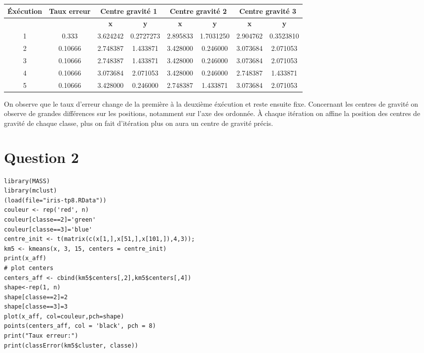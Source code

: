\documentclass[a4paper,12pt]{report}
\begin{document}
\begin{tabular}{|c|c|c|c|c|c|c|c|}
   \hline
   \cellcolor{gray!40}\textbf{Éxécution} & \cellcolor{gray!40}\textbf{Taux erreur} & \multicolumn{2}{c}{\cellcolor{gray!40}\textbf{Centre gravité 1}} & \multicolumn{2}{c}{\cellcolor{gray!40}\textbf{Centre gravité 2}} & \multicolumn{2}{c}{\cellcolor{gray!40}\textbf{Centre gravité 3}} \\
   \hline
   \cellcolor{gray!40}\textbf{ } & \cellcolor{gray!40}\textbf{ } & 		\cellcolor{gray!40}\textbf{x}& 		\cellcolor{gray!40}\textbf{y}& 		\cellcolor{gray!40}\textbf{x}& 		\cellcolor{gray!40}\textbf{y}& 		\cellcolor{gray!40}\textbf{x}& 		\cellcolor{gray!40}\textbf{y} \\
   \hline
   1 & 0.333 & 3.624242 & 0.2727273 & 2.895833  & 1.7031250 & 2.904762 & 0.3523810  \\
   \hline
   2 & 0.10666 & 2.748387 & 1.433871 & 3.428000 & 0.246000 & 3.073684 & 2.071053  \\
   \hline
   3 & 0.10666 & 2.748387 & 1.433871 & 3.428000 & 0.246000 & 3.073684 & 2.071053 \\
   \hline
   4 & 0.10666 & 3.073684 & 2.071053 & 3.428000 & 0.246000 & 2.748387 & 1.433871 \\
   \hline
   5 & 0.10666 & 3.428000 & 0.246000 & 2.748387 & 1.433871 & 3.073684 & 2.071053 \\
   \hline
\end{tabular}

On observe que le taux d'erreur change de la première à la deuxième éxécution et reste ensuite fixe. Concernant les centres de gravité on observe de grandes différences sur les positions, notamment sur l'axe des ordonnée. À chaque itération on affine la position des centres de gravité de chaque classe, plus on fait d'itération plus on aura un centre de gravité précis.

\newpage

\section*{Question 2}

\begin{lstlisting}library(MASS)
library(mclust)
(load(file="iris-tp8.RData"))
couleur <- rep('red', n)
couleur[classe==2]='green'
couleur[classe==3]='blue'
centre_init <- t(matrix(c(x[1,],x[51,],x[101,]),4,3));
km5 <- kmeans(x, 3, 15, centers = centre_init)
print(x_aff)
# plot centers
centers_aff <- cbind(km5$centers[,2],km5$centers[,4])
shape<-rep(1, n) 
shape[classe==2]=2
shape[classe==3]=3
plot(x_aff, col=couleur,pch=shape)
points(centers_aff, col = 'black', pch = 8)
print("Taux erreur:")
print(classError(km5$cluster, classe))
\end{lstlisting}
\end{document}
